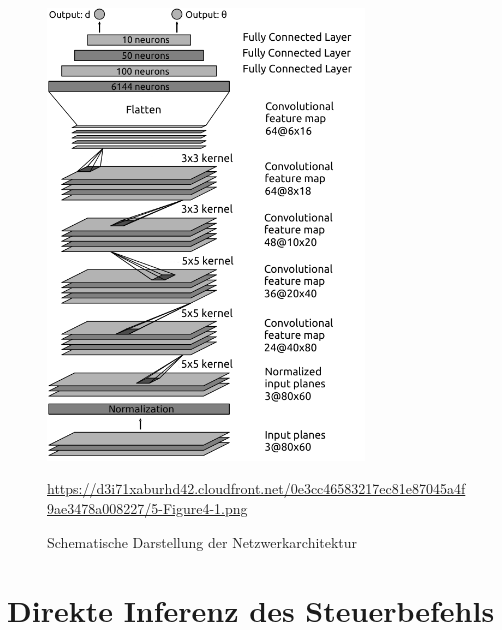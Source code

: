 \begin{figure}[H]
	\centering
	\includegraphics[width=0.75\textwidth]{kapitel4/images/network_architecture.png}
	\caption{Schematische Darstellung der Netzwerkarchitektur}
	\label{network-architecture}
	\vspace{0.2cm}
	\quelle\url{https://d3i71xaburhd42.cloudfront.net/0e3cc46583217ec81e87045a4f9ae3478a008227/5-Figure4-1.png}
\end{figure}

\section{Direkte Inferenz des Steuerbefehls}




